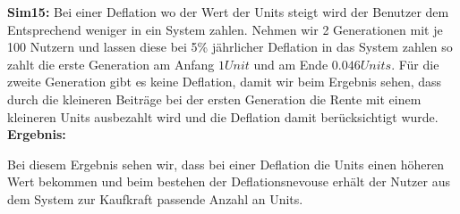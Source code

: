 \textbf{Sim15:} Bei einer Deflation wo der Wert der Units steigt wird der Benutzer dem Entsprechend weniger in ein System zahlen. Nehmen wir 2 Generationen mit je 100 Nutzern und lassen diese bei 5\% jährlicher Deflation in das System zahlen so zahlt die erste Generation am Anfang $1 Unit$  und am Ende $0.046 Units$. Für die zweite Generation gibt es keine Deflation, damit wir beim Ergebnis sehen, dass durch die kleineren Beiträge bei der ersten Generation die Rente mit einem kleineren Units ausbezahlt wird und die Deflation damit berücksichtigt wurde. \\

\textbf{Ergebnis:}

\begin{table}[h!]
\centering
{}
\end{table}

Bei diesem Ergebnis sehen wir, dass bei einer Deflation die Units einen höheren Wert bekommen und beim bestehen der Deflationsnevouse erhält der Nutzer aus dem System zur Kaufkraft passende Anzahl an Units.


